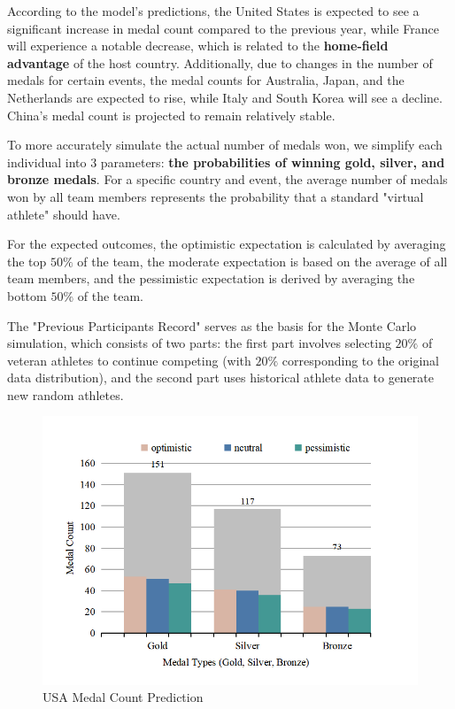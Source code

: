 \documentclass[12pt]{article}  %
\begin{document}
According to the model's predictions, the United States is expected to see a significant increase in medal count compared to the previous year, while France will experience a notable decrease, which is related to the \textbf{home-field advantage} of the host country. Additionally, due to changes in the number of medals for certain events, the medal counts for Australia, Japan, and the Netherlands are expected to rise, while Italy and South Korea will see a decline. China's medal count is projected to remain relatively stable.

To more accurately simulate the actual number of medals won, we simplify each individual into 3 parameters: \textbf{the probabilities of winning gold, silver, and bronze medals}. For a specific country and event, the average number of medals won by all team members represents the probability that a standard "virtual athlete" should have.

For the expected outcomes, the optimistic expectation is calculated by averaging the top \( 50\% \) of the team, the moderate expectation is based on the average of all team members, and the pessimistic expectation is derived by averaging the bottom \( 50\% \) of the team.

The "Previous Participants Record" serves as the basis for the Monte Carlo simulation, which consists of two parts: the first part involves selecting \( 20\% \) of veteran athletes to continue competing (with \( 20\% \) corresponding to the original data distribution), and the second part uses historical athlete data to generate new random athletes.


\begin{figure}[H]
	\centering
	\includegraphics[width=12cm]{img/OP1.png}
	\caption{USA Medal Count Prediction}
	\label{fig:USA}
\end{figure}
\end{document}
